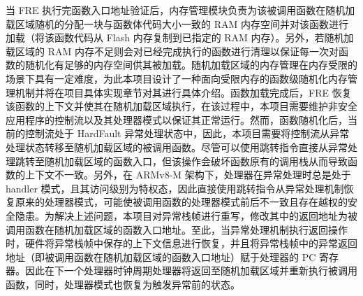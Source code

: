\documentclass[12pt,a4paper]{ctexart}
\numberwithin{figure}{section}
\begin{document}
\par 当 FRE 执行完函数入口地址验证后，内存管理模块负责为该被调用函数在随机加载区域随机的分配一块与函数体代码大小一致的 RAM 内存空间并对该函数进行加载（将该函数代码从 Flash 内存复制到已指定的 RAM 内存）。另外，若随机加载区域的 RAM 内存不足则会对已经完成执行的函数进行清理以保证每一次对函数的随机化有足够的内存空间供其被加载。随机加载区域的内存管理在内存受限的场景下具有一定难度，为此本项目设计了一种面向受限内存的函数级随机化内存管理机制并将在项目具体实现章节对其进行具体介绍。函数加载完成后，FRE 恢复该函数的上下文并使其在随机加载区域执行，在该过程中，本项目需要维护非安全应用程序的控制流以及其处理器模式以保证其正常运行。然而，函数随机化后，当前的控制流处于 HardFault 异常处理状态中，因此，本项目需要将控制流从异常处理状态转移至随机加载区域的被调用函数。尽管可以使用跳转指令直接从异常处理跳转至随机加载区域的函数入口，但该操作会破坏函数原有的调用栈从而导致函数的上下文不一致。另外，在 ARMv8-M 架构下，处理器在异常处理时总是处于 handler 模式，且其访问级别为特权态，因此直接使用跳转指令从异常处理机制恢复原来的处理器模式，可能使被调用函数的处理器模式前后不一致且存在越权的安全隐患。为解决上述问题，本项目对异常栈帧进行重写，修改其中的返回地址为被调用函数在随机加载区域的函数入口地址。至此，当异常处理机制执行返回操作时，硬件将异常栈帧中保存的上下文信息进行恢复，并且将异常栈帧中的异常返回地址（即被调用函数在随机加载区域的函数入口地址）赋于处理器的 PC 寄存器。因此在下一个处理器时钟周期处理器将返回至随机加载区域并重新执行被调用函数，同时，处理器模式也恢复为触发异常前的状态。
\end{document}
